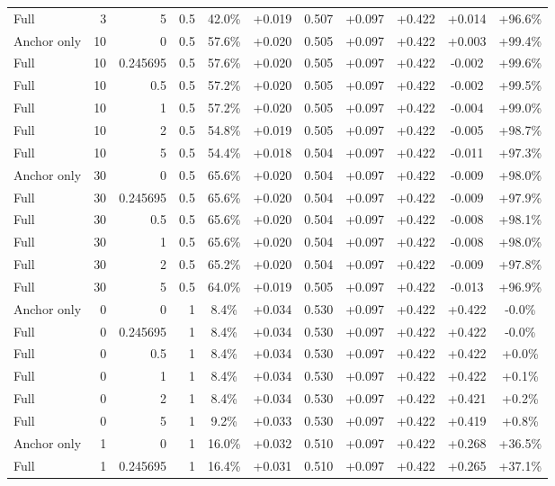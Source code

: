 \begin{table}[htbp]
\begin{tabular}{lrrrccccccc}
Full & 3 & 5 & 0.5 & 42.0\% & +0.019 & 0.507 & +0.097 & +0.422 & +0.014 & +96.6\% \\
Anchor only & 10 & 0 & 0.5 & 57.6\% & +0.020 & 0.505 & +0.097 & +0.422 & +0.003 & +99.4\% \\
Full & 10 & 0.245695 & 0.5 & 57.6\% & +0.020 & 0.505 & +0.097 & +0.422 & -0.002 & +99.6\% \\
Full & 10 & 0.5 & 0.5 & 57.2\% & +0.020 & 0.505 & +0.097 & +0.422 & -0.002 & +99.5\% \\
Full & 10 & 1 & 0.5 & 57.2\% & +0.020 & 0.505 & +0.097 & +0.422 & -0.004 & +99.0\% \\
Full & 10 & 2 & 0.5 & 54.8\% & +0.019 & 0.505 & +0.097 & +0.422 & -0.005 & +98.7\% \\
Full & 10 & 5 & 0.5 & 54.4\% & +0.018 & 0.504 & +0.097 & +0.422 & -0.011 & +97.3\% \\
Anchor only & 30 & 0 & 0.5 & 65.6\% & +0.020 & 0.504 & +0.097 & +0.422 & -0.009 & +98.0\% \\
Full & 30 & 0.245695 & 0.5 & 65.6\% & +0.020 & 0.504 & +0.097 & +0.422 & -0.009 & +97.9\% \\
Full & 30 & 0.5 & 0.5 & 65.6\% & +0.020 & 0.504 & +0.097 & +0.422 & -0.008 & +98.1\% \\
Full & 30 & 1 & 0.5 & 65.6\% & +0.020 & 0.504 & +0.097 & +0.422 & -0.008 & +98.0\% \\
Full & 30 & 2 & 0.5 & 65.2\% & +0.020 & 0.504 & +0.097 & +0.422 & -0.009 & +97.8\% \\
Full & 30 & 5 & 0.5 & 64.0\% & +0.019 & 0.505 & +0.097 & +0.422 & -0.013 & +96.9\% \\
Anchor only & 0 & 0 & 1 & 8.4\% & +0.034 & 0.530 & +0.097 & +0.422 & +0.422 & -0.0\% \\
Full & 0 & 0.245695 & 1 & 8.4\% & +0.034 & 0.530 & +0.097 & +0.422 & +0.422 & -0.0\% \\
Full & 0 & 0.5 & 1 & 8.4\% & +0.034 & 0.530 & +0.097 & +0.422 & +0.422 & +0.0\% \\
Full & 0 & 1 & 1 & 8.4\% & +0.034 & 0.530 & +0.097 & +0.422 & +0.422 & +0.1\% \\
Full & 0 & 2 & 1 & 8.4\% & +0.034 & 0.530 & +0.097 & +0.422 & +0.421 & +0.2\% \\
Full & 0 & 5 & 1 & 9.2\% & +0.033 & 0.530 & +0.097 & +0.422 & +0.419 & +0.8\% \\
Anchor only & 1 & 0 & 1 & 16.0\% & +0.032 & 0.510 & +0.097 & +0.422 & +0.268 & +36.5\% \\
Full & 1 & 0.245695 & 1 & 16.4\% & +0.031 & 0.510 & +0.097 & +0.422 & +0.265 & +37.1\% \\

\end{tabular}
\end{table}
